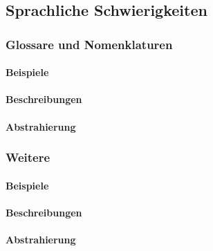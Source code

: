 \subsection{Sprachliche Schwierigkeiten}\label{problems:additional}
\subsubsection{Glossare und Nomenklaturen}
\paragraph*{Beispiele}
\paragraph*{Beschreibungen}
\paragraph*{Abstrahierung}

\subsubsection{Weitere}
\paragraph*{Beispiele}
\paragraph*{Beschreibungen}
\paragraph*{Abstrahierung}
